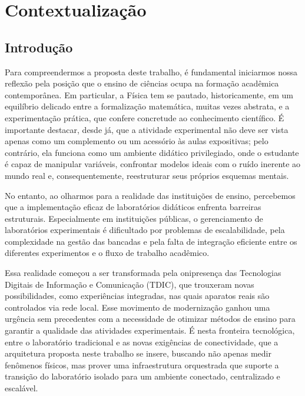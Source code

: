 \chapter{Contextualização}

\section{Introdução}

Para compreendermos a proposta deste trabalho, é fundamental iniciarmos nossa reflexão pela posição que o ensino de ciências ocupa na formação acadêmica contemporânea. Em particular, a Física tem se pautado, historicamente, em um equilíbrio delicado entre a formalização matemática, muitas vezes abstrata, e a experimentação prática, que confere concretude ao conhecimento científico. É importante destacar, desde já, que a atividade experimental não deve ser vista apenas como um complemento ou um acessório às aulas expositivas; pelo contrário, ela funciona como um ambiente didático privilegiado, onde o estudante é capaz de manipular variáveis, confrontar modelos ideais com o ruído inerente ao mundo real e, consequentemente, reestruturar seus próprios esquemas mentais.

No entanto, ao olharmos para a realidade das instituições de ensino, percebemos que a implementação eficaz de laboratórios didáticos enfrenta barreiras estruturais. Especialmente em instituições públicas, o gerenciamento de laboratórios experimentais é dificultado por problemas de escalabilidade, pela complexidade na gestão das bancadas e pela falta de integração eficiente entre os diferentes experimentos e o fluxo de trabalho acadêmico.

Essa realidade começou a ser transformada pela onipresença das Tecnologias Digitais de Informação e Comunicação (TDIC), que trouxeram novas possibilidades, como experiências integradas, nas quais aparatos reais são controlados via rede local. Esse movimento de modernização ganhou uma urgência sem precedentes com a necessidade de otimizar métodos de ensino para garantir a qualidade das atividades experimentais. É nesta fronteira tecnológica, entre o laboratório tradicional e as novas exigências de conectividade, que a arquitetura proposta neste trabalho se insere, buscando não apenas medir fenômenos físicos, mas prover uma infraestrutura orquestrada que suporte a transição do laboratório isolado para um ambiente conectado, centralizado e escalável.

